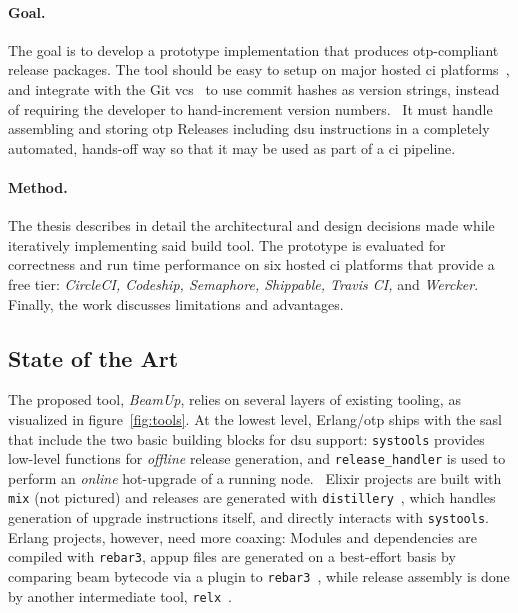 \paragraph{Goal.} The goal is to develop a prototype implementation that produces \acrshort{otp}-compliant release packages. The tool should be easy to setup on major hosted \acrshort{ci} platforms~\cite{dig2016usage}, and integrate with the Git \acrfull{vcs}~\cite{sink2011version} to use commit hashes as version strings, instead of requiring the developer to hand-increment version numbers.~\cite{maste2016} It must handle assembling and storing \acrshort{otp} Releases including \acrshort{dsu} instructions in a completely automated, hands-off way so that it may be used as part of a \acrshort{ci} pipeline.

\paragraph{Method.} The thesis describes in detail the architectural and design decisions made while iteratively implementing said build tool. The prototype is evaluated for correctness and run time performance on six hosted \acrshort{ci} platforms that provide a free tier: \emph{CircleCI, Codeship, Semaphore, Shippable, Travis CI,} and \emph{Wercker}. Finally, the work discusses limitations and advantages.


\subsection{State of the Art}\label{sec:sota}

The proposed tool, \emph{BeamUp}, relies on several layers of existing tooling, as visualized in figure~\ref{fig:tools}. At the lowest level, Erlang/\acrshort{otp} ships with the \acrfull{sasl} that include the two basic building blocks for \acrshort{dsu} support: \lstinline|systools| provides low-level functions for \emph{offline} release generation, and \lstinline|release_handler| is used to perform an \emph{online} hot-upgrade of a running node.~\cite{doc:otp}
Elixir projects are built with \lstinline|mix| (not pictured) and releases are generated with \lstinline|distillery|~\cite{distillery}, which handles generation of upgrade instructions itself, and directly interacts with \lstinline|systools|. Erlang projects, however, need more coaxing: Modules and dependencies are compiled with \lstinline|rebar3|, \acrfull{appup} files are generated on a best-effort basis by comparing \acrshort{beam} bytecode via a plugin to \lstinline|rebar3|~\cite{rebar3appup}, while release assembly is done by another intermediate tool, \lstinline|relx|~\cite{loder2016production}.

